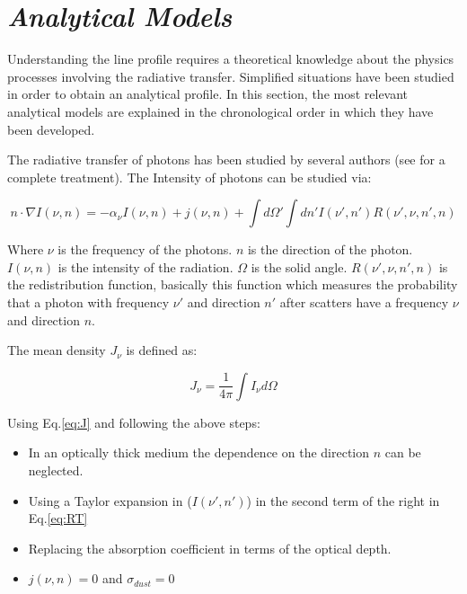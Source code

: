   

\section{\emph{Analytical Models}}\label{sec:analytic}

Understanding the \ly line profile requires a theoretical knowledge
about the physics processes involving the radiative transfer. Simplified 
situations have been studied in order to obtain an analytical 
 profile.  In this section, the most relevant 
analytical models are explained in the chronological order in which 
they have been developed. 

The radiative transfer of \ly photons has been studied by several authors
(see \citep{RybickiLightman79} for a complete treatment). The Intensity
of \ly photons can be studied via:
 
\begin{equation}\label{eq:RT}
n\cdot\nabla I(\nu, n)= - \alpha_{\nu} I(\nu, n) + j(\nu, n) + \int d\Omega' \int dn' I(\nu', n') R(\nu', \nu, n', n)
\end{equation}

Where $\nu$ is the frequency of the \ly photons. $n$ is the direction 
of the \ly photon. $I(\nu, n)$ is the intensity
of the radiation. $\Omega$ is the solid angle. $R(\nu', \nu, n', n)$ 
is the redistribution function, basically this function which measures 
the probability that a \ly photon with frequency $\nu'$ and direction $n'$
after scatters have a frequency $\nu$ and direction $n$.

The mean density $J_{\nu}$ is defined as:

\begin{equation}\label{eq:J}
J_{\nu} = \dfrac{1}{4\pi}\int I_{\nu}d\Omega
\end{equation}


Using Eq.\ref{eq:J} and following the above steps:

\begin{itemize}
\item In an optically thick medium the dependence on the direction {\bf{$n$}} can 
be neglected.
\item Using a Taylor expansion in ($I(\nu', n')$) in the second term of the right in Eq.\ref{eq:RT} 
\item Replacing the absorption coefficient in terms of the optical depth.
\item $j(\nu, n)=0$ and $\sigma_{dust}=0$
\end{itemize}

